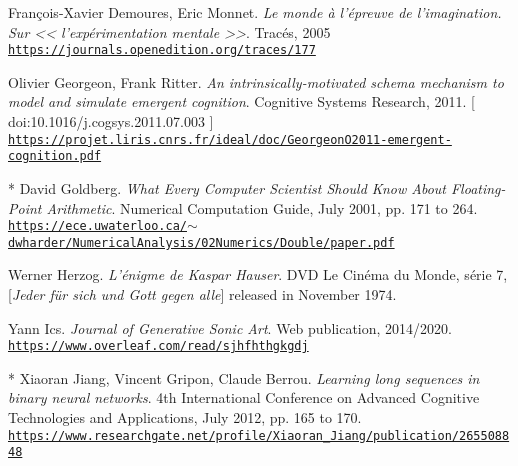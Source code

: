 \begin{thebibliography}{99}
	 François-Xavier Demoures, Eric Monnet. \textit{Le monde à l’épreuve de l’imagination. Sur << l’expérimentation mentale >>}. Tracés, 2005 \\ \href{https://journals.openedition.org/traces/177}{\scriptsize{\texttt{https://journals.openedition.org/traces/177}}} \normalsize{}
	 
	 Olivier Georgeon, Frank Ritter. \textit{An intrinsically-motivated schema mechanism to model and simulate emergent cognition}. 
	 Cognitive Systems Research, 2011. {\scriptsize [ doi:10.1016/j.cogsys.2011.07.003 ]}
	 \\ \href{https://projet.liris.cnrs.fr/ideal/doc/GeorgeonO2011-emergent-cognition.pdf}{\scriptsize{\texttt{https://projet.liris.cnrs.fr/ideal/doc/GeorgeonO2011-emergent-cognition.pdf}}} \normalsize{}
	 
	 
	 * David Goldberg. \textit{What Every Computer Scientist Should Know About Floating-Point Arithmetic}. Numerical Computation Guide, July 2001, pp. 171 to 264.\\ \href{https://ece.uwaterloo.ca/\~dwharder/NumericalAnalysis/02Numerics/Double/paper.pdf}{\scriptsize{\texttt{https://ece.uwaterloo.ca/$\sim$dwharder/NumericalAnalysis/02Numerics/Double/paper.pdf}}} \normalsize{}
	 
	 Werner Herzog. \textit{L'énigme de Kaspar Hauser}. DVD Le Cinéma du Monde, série 7, [\textit{Jeder für sich und Gott gegen alle}] released in November 1974.
	 
	 Yann Ics. \textit{Journal of Generative Sonic Art}. Web publication, 2014/2020.\\ \href{https://www.overleaf.com/read/sjhfhthgkgdj}{\scriptsize{\texttt{https://www.overleaf.com/read/sjhfhthgkgdj}}} \normalsize{}
	
	 * Xiaoran Jiang, Vincent Gripon, Claude Berrou. \textit{Learning long sequences in binary neural networks}. 4th International Conference on Advanced Cognitive Technologies and Applications, July 2012, pp. 165 to 170.\\ \href{https://www.researchgate.net/profile/Xiaoran\_Jiang/publication/265508848\_Learning\_Long\_Sequences\_in\_Binary\_Neural\_Networks/links/54107a6c0cf2f2b29a410d8c.pdf}{\scriptsize{\texttt{https://www.researchgate.net/profile/Xiaoran\_Jiang/publication/265508848}}} \normalsize{}
	 

\end{thebibliography}
